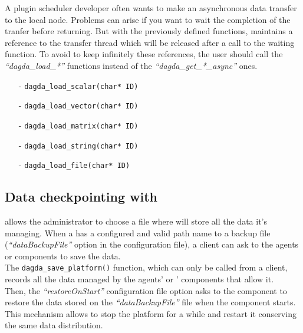 A plugin scheduler developer often wants to make an
asynchronous data transfer to the local \diet node. Problems can arise if you
want to wait the completion of the tranfer before returning. 
But with the previously defined functions, \dagda maintains a reference to
the transfer thread which will be released after a call to the waiting
function. To avoid \dagda to keep infinitely these references, the
user should call the \textit{``dagda\_load\_*''} functions instead of
the \textit{``dagda\_get\_*\_async''} ones.

\begin{itemize}
\item[-] \verb#dagda_load_scalar(char* ID)#
\item[-] \verb#dagda_load_vector(char* ID)#
\item[-] \verb#dagda_load_matrix(char* ID)#
\item[-] \verb#dagda_load_string(char* ID)#
\item[-] \verb#dagda_load_file(char* ID)#
\end{itemize}

\subsection{Data checkpointing with \dagda}
\dagda allows the \sed administrator to choose a file where \dagda will
store all the data it's managing. When a \sed has a configured and valid
path name to a backup file (\textit{``dataBackupFile''} option in the
configuration file), a client can ask to the agents or \seds \dagda
components to save the data.\\

The \verb#dagda_save_platform()# function, which can only be called
from a client, records all the data managed by the agents' or \seds'
\dagda components that allow it.\\ Then, the \textit{``restoreOnStart''}
configuration file option asks to the \dagda component to restore the
data stored on the \textit{``dataBackupFile''} file when the component
starts. This mechanism allows to stop the \diet platform for a while
and restart it conserving the same data distribution.

